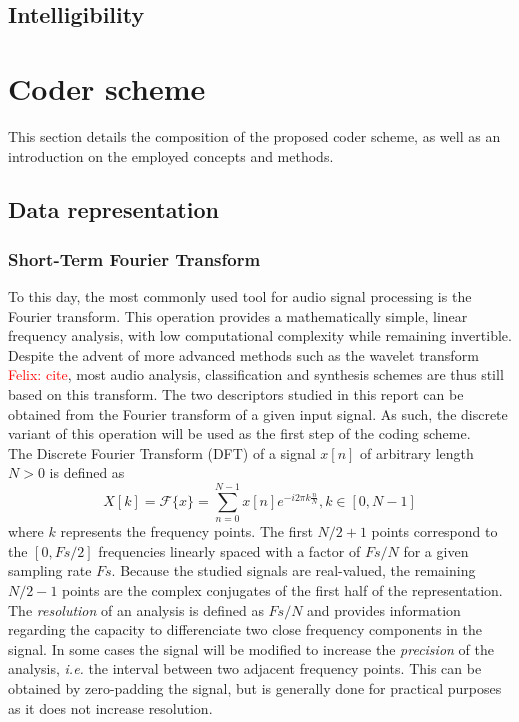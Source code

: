 \documentclass[12pt,times,onecolumn]{article}
\newcommand{\fg}[1]{\textcolor{red}{ Felix: #1}}
\begin{document}
\subsection{Intelligibility}

\section{Coder scheme}

This section details the composition of the proposed coder scheme, as well as an introduction on the employed concepts and methods.

\subsection{Data representation}
\subsubsection{Short-Term Fourier Transform}
To this day, the most commonly used tool for audio signal processing is the Fourier transform. This operation provides a mathematically simple, linear frequency analysis, with low computational complexity while remaining invertible. Despite the advent of more advanced methods such as the wavelet transform \fg{cite}, most audio analysis, classification and synthesis schemes are thus still based on this transform. The two descriptors studied in this report can be obtained from the Fourier transform of a given input signal. As such, the discrete variant of this operation will be used as the first step of the coding scheme.\\

The Discrete Fourier Transform (DFT) of a signal $x[n]$ of arbitrary length $N>0$ is defined as
\begin{equation}
X[k] = \mathcal{F}\{x\} = \sum\limits_{n = 0}^{N-1} x[n]e^{-i2\pi k\frac{n}{N}}, k\in [0, N-1]
\end{equation}
where $k$ represents the frequency points. The first $N/2+1$ points correspond to the $[0, Fs/2]$ frequencies linearly spaced with a factor of $Fs/N$ for a given sampling rate $Fs$. Because the studied signals are real-valued, the remaining $N/2-1$ points are the complex conjugates of the first half of the representation. The \textit{resolution} of an analysis is defined as $Fs/N$ and provides information regarding the capacity to differenciate two close frequency components in the signal. In some cases the signal will be modified to increase the \textit{precision} of the analysis, \textit{i.e.} the interval between two adjacent frequency points. This can be obtained by zero-padding the signal, but is generally done for practical purposes as it does not increase resolution.
\end{document}
